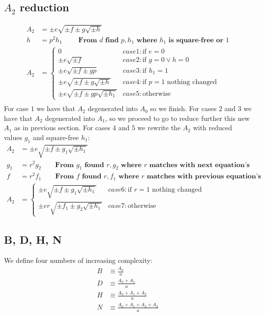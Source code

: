 \documentclass{article}
\begin{document}
\subsection{$A_2$ reduction}
\begin{align}
A_2 &= \pm e\sqrt{\pm f \pm g\sqrt{\pm h}}\\
h   &= p^2h_1 \qquad \textbf{ From $d$ find $p,h_1$ where $h_1$ is square-free or $1$} \\
A_2 &= \begin{cases}
 0                                    &case 1: \text{if } e = 0\\
 \pm e\sqrt{\pm f}                    &case 2: \text{if } g = 0 \lor h = 0\\
 \pm e\sqrt{\pm f \pm gp}             &case 3: \text{if } h_1 = 1\\
 \pm e\sqrt{\pm f \pm g\sqrt{\pm h}}  &case 4: \text{if } p = 1 \text{ nothing changed}\\
 \pm e\sqrt{\pm f \pm gp\sqrt{\pm h_1}} &case 5: \text{otherwise }
\end{cases}\\
\end{align}
For case $1$ we have that $A_2$ degenerated into $A_0$ so we finish.
For cases $2$ and $3$ we have that $A_2$ degenerated into $A_1$, so we proceed to go
to reduce further this new $A_1$ as in previous section. For cases $4$ and $5$ we rewrite
the $A_2$ with reduced values $g_1$ and square-free $h_1$:
\begin{align}
A_2 &= \pm e\sqrt{\pm f \pm g_1\sqrt{\pm h_1}}\\
g_1 &= r^2g_2 \qquad \textbf{From $g_1$ found $r,g_2$ where $r$ matches with next equation's}\\
f   &= r^2f_1 \qquad \textbf{From $f$ found $r,f_1$ where $r$ matches with previous equation's}\\
A_2 &= \begin{cases}
 \pm e\sqrt{\pm f \pm g_1\sqrt{\pm h_1}} &case 6: \text{if } r = 1 \text{ nothing changed}\\
 \pm er\sqrt{\pm f_1 \pm g_2\sqrt{\pm h_1}}  &case 7: \text{otherwise }
\end{cases}
\end{align}

\subsection{B, D, H, N}

We define four numbers of increasing complexity:
\begin{align}
B &\equiv \frac{A_0}{a}\\
D &\equiv \frac{A_0 + A_1}{a}\\
H &\equiv \frac{A_0 + A_1 + A_2}{a}\\
N &\equiv \frac{A_0 + A_1 + A_2 + A_3}{a}
\end{align}
\end{document}

